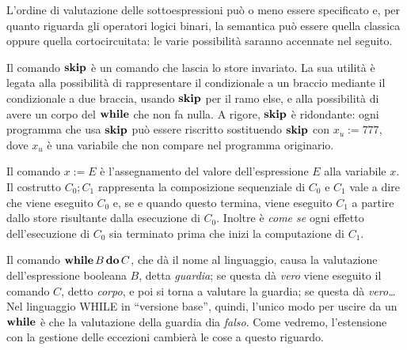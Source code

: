 L'ordine di valutazione delle sottoespressioni può o meno essere specificato
e, per quanto riguarda gli operatori logici binari, la semantica può essere
quella classica oppure quella cortocircuitata: le varie possibilità
saranno accennate nel seguito.

Il comando $\mathop{\textup{\textbf{skip}}}$ è un comando che lascia lo store invariato.
La sua utilità è legata alla possibilità di rappresentare il condizionale
a un braccio mediante il condizionale a due braccia, usando $\mathop{\textup{\textbf{skip}}}$ per
il ramo else, e alla possibilità di avere un corpo del $\mathop{\textup{\textbf{while}}}$ che
non fa nulla.  A rigore, $\mathop{\textup{\textbf{skip}}}$ è ridondante: ogni programma
che usa $\mathop{\textup{\textbf{skip}}}$ può essere riscritto sostituendo $\mathop{\textup{\textbf{skip}}}$
con $x_u := 777$, dove $x_u$ è una variabile che non compare nel
programma originario.

Il comando $x := E$ è l'assegnamento del valore dell'espressione $E$
alla variabile $x$.  Il costrutto $C_0; C_1$ rappresenta la composizione
sequenziale di $C_0$ e $C_1$ vale a dire che viene eseguito $C_0$ e,
se e quando questo termina, viene eseguito $C_1$ a partire dallo store
risultante dalla esecuzione di $C_0$.  Inoltre è \emph{come se} ogni
effetto dell'esecuzione di $C_0$ sia terminato prima che inizi la
computazione di $C_1$.

Il comando $\mathop{\textup{\textbf{while}}} B \mathop{\textup{\textbf{do}}} C$, che dà il nome al linguaggio,
causa la valutazione dell'espressione booleana $B$, detta \emph{guardia};
se questa dà \emph{vero} viene eseguito il comando $C$, detto \emph{corpo},
e poi si torna a valutare la guardia; se questa dà \emph{vero}\dots
Nel linguaggio WHILE in ``versione base'', quindi, l'unico modo per
uscire da un $\mathop{\textup{\textbf{while}}}$ è che la valutazione della guardia dia \emph{falso}.
Come vedremo, l'estensione con la gestione delle eccezioni cambierà le cose
a questo riguardo.
